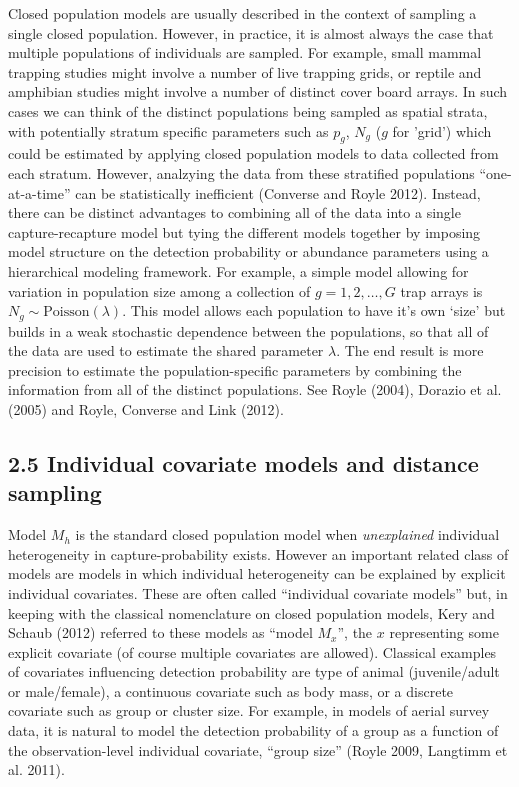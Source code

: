 \documentclass{book}
\begin{document}
Closed population models are usually described in the context of
sampling a single closed population. However, in practice, it is
almost always the case that multiple populations of individuals are
sampled. For example, small mammal trapping studies might involve a
number of live trapping grids, or reptile and amphibian studies might
involve a number of distinct cover board arrays.  In such cases we can
think of the distinct populations being sampled as spatial strata,
with potentially stratum specific parameters such as $p_{g}$, $N_{g}$
($g$ for 'grid') which could be estimated by applying closed
population models to data collected from each stratum.  However,
analzying the data from these stratified populations ``one-at-a-time''
can be statistically inefficient (Converse and Royle 2012). Instead,
there can be distinct advantages to combining all of the data into a
single capture-recapture model but tying the different models together
by imposing model structure on the detection probability or abundance
parameters using a hierarchical modeling framework.  For example, a
simple model allowing for variation in population size among a
collection of $g=1,2,\ldots,G$ trap arrays is $N_{g} \sim
\mbox{Poisson}(\lambda)$. This model allows each population to have
it's own `size' but builds in a weak stochastic dependence between the
populations, so that all of the data are used to estimate the shared
parameter $\lambda$. The end result is more precision to estimate the
population-specific parameters by combining the information from all
of the distinct populations. See Royle (2004), Dorazio et al. (2005)
and Royle, Converse and Link (2012).


\subsection*{2.5 Individual covariate models and distance sampling}

Model $M_h$ is the standard closed population model when {\it
  unexplained} individual heterogeneity in capture-probability
exists. However an important related class of models are models in
which individual heterogeneity can be explained by explicit individual
covariates. These are often called ``individual covariate models''
but, in keeping with the classical nomenclature on closed population
models, Kery and Schaub (2012) referred to these models as ``model
$M_{x}$'', the $x$ representing some explicit covariate (of course
multiple covariates are allowed).  Classical examples of covariates
influencing detection probability are type of animal (juvenile/adult
or male/female), a continuous covariate such as body mass, or a
discrete covariate such as group or cluster size. For example, in
models of aerial survey data, it is natural to model the detection
probability of a group as a function of the observation-level
individual covariate, ``group size'' (Royle 2009, Langtimm et
al. 2011).
\end{document}
